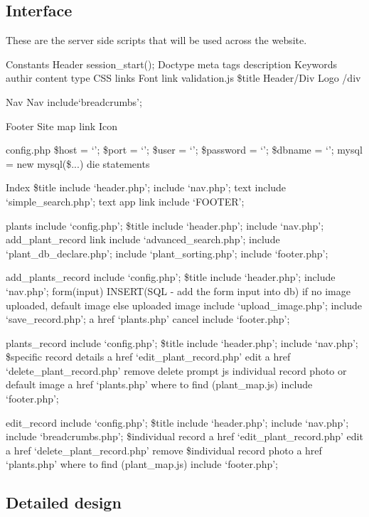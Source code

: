\subsection{Interface}
These are the server side scripts that will be used across the website.

Constants	
Header
	session\_start();
	Doctype
	meta tags
		description
		Keywords
		authir
		content type
		CSS links
		Font link
		validation.js
		\$title
	Header/Div
		Logo
	/div

Nav
	Nav
	include`breadcrumbs';
	
Footer 
	Site map link 
	Icon
	
	
config.php
	\$host = `';
	\$port = `';
	\$user = `';
	\$password = `';
	\$dbname = `';
	mysql = new mysql(\$...)
	die statements

	
Index
	\$title
	include `header.php';
	include `nav.php';
	text
	include `simple\_search.php';
	text
		app link
	include `FOOTER';
	
plants
	include `config.php';
	\$title
	include `header.php';
	include `nav.php';
	add\_plant\_record link
	include `advanced\_search.php';
	include `plant\_db\_declare.php';
	include `plant\_sorting.php';
	include `footer.php';

add\_plants\_record
	include `config.php';
	\$title
	include `header.php';
	include `nav.php';
	form(input)  INSERT(SQL - add the form input into db)
	if no image uploaded, default image else uploaded image
	include `upload\_image.php';
	include `save\_record.php';
	a href `plants.php' cancel
	include `footer.php';


plants\_record
	include `config.php';
	\$title
	include `header.php';
	include `nav.php';
	\$specific record details
	a href `edit\_plant\_record.php' edit
	a href `delete\_plant\_record.php' remove
		delete prompt js
	individual record photo or default image
	a href `plants.php' where to find
		(plant\_map.js)
	include `footer.php';
	
	
	
	
edit\_record
	include `config.php';
	\$title
	include `header.php';
	include `nav.php';
	include `breadcrumbs.php';
	\$individual record
	a href `edit\_plant\_record.php' edit
	a href `delete\_plant\_record.php' remove
	\$individual record photo
	a href `plants.php' where to find
		(plant\_map.js)
	include `footer.php';
	
\subsection{Detailed design}

